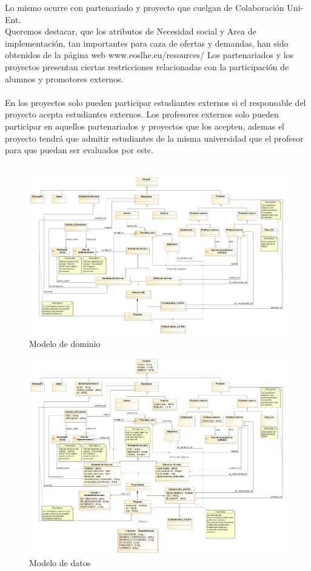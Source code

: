 \documentclass[11pt]{article}
\begin{document}
Lo mismo ocurre con partenariado y proyecto que cuelgan de Colaboración Uni-Ent.\\
Queremos destacar, que los atributos de Necesidad social y Area de implementación, tan importantes para caza de ofertas y demandas, han sido obtenidos de la página web www.eoslhe.eu/resources/
Los partenariados y los proyectos presentan ciertas restricciones relacionadas con la participación de alumnos y promotores externos.\\\\
En los proyectos solo pueden participar estudiantes externos si el responsable del proyecto acepta estudiantes externos. 
Los profesores externos solo pueden participar en aquellos partenariados y proyectos que los acepten, ademas el proyecto tendrá que admitir estudiantes de la misma universidad que el profesor para que puedan ser evaluados por este.\\\\
\begin{figure}
	\centering
	\includegraphics[scale=0.23]{mdominio}
	\caption{Modelo de dominio}
\end{figure}
\begin{figure}
	\centering
	\includegraphics[scale=0.23]{mdatos}
	\caption{Modelo de datos}
\end{figure}
\end{document}
